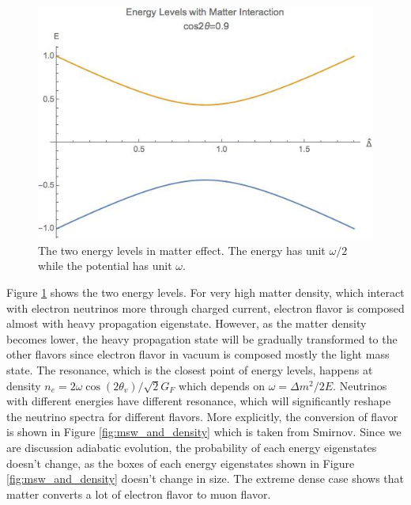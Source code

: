 \documentclass[%
 aip,
 jmp,%
 amsmath,amssymb,
 reprint,%
]{revtex4-1}
\begin{document}
\begin{figure}
\centering
\includegraphics[width=\columnwidth]{assets/mswEnergyLevels.jpg}
\caption{The two energy levels in matter effect. The energy has unit $\omega/2$ while the potential has unit $\omega$.}
\label{fig:mswEnergyLevels}
\end{figure}

Figure \ref{fig:mswEnergyLevels} shows the two energy levels. For very high matter density, which interact with electron neutrinos more through charged current, electron flavor is composed almost with heavy propagation eigenstate. However, as the matter density becomes lower, the heavy propagation state will be gradually transformed to the other flavors since electron flavor in vacuum is composed mostly the light mass state. The resonance, which is the closest point of energy levels, happens at density $n_e　 = 2\omega \cos(2\theta_v)/\sqrt{2}G_F$ which depends on $\omega = \Delta m^2/2E$. Neutrinos with different energies have different resonance, which will significantly reshape the neutrino spectra for different flavors. More explicitly, the conversion of flavor is shown in
Figure \ref{fig:msw_and_density} which is taken from Smirnov.\cite{Smirnov2003} Since we are discussion adiabatic evolution, the probability of each energy eigenstates doesn't change, as the boxes of each energy eigenstates shown in Figure \ref{fig:msw_and_density} doesn't change in size. The extreme dense case shows that matter converts a lot of electron flavor to muon flavor.
\end{document}
